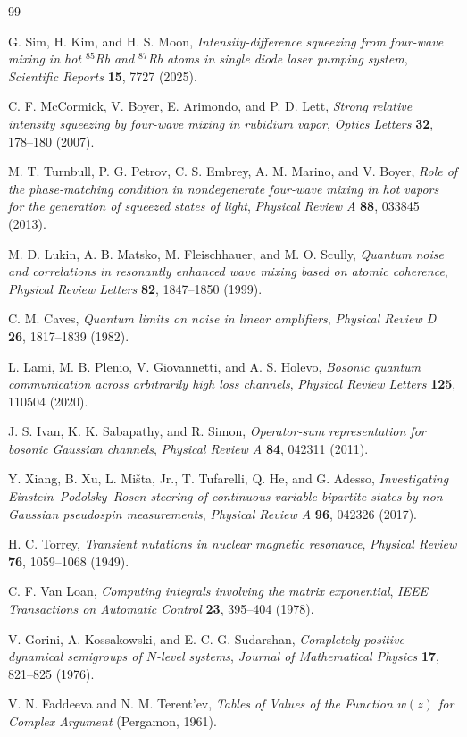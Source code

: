 \documentclass[11pt,a4paper]{article}
\begin{document}
\begin{thebibliography}{99}

G. Sim, H. Kim, and H. S. Moon,
\emph{Intensity-difference squeezing from four-wave mixing in hot
$^{85}$Rb and $^{87}$Rb atoms in single diode laser pumping system},
\emph{Scientific Reports} \textbf{15}, 7727 (2025).

C. F. McCormick, V. Boyer, E. Arimondo, and P. D. Lett,
\emph{Strong relative intensity squeezing by four-wave mixing in rubidium
vapor}, \emph{Optics Letters} \textbf{32}, 178--180 (2007).

M. T. Turnbull, P. G. Petrov, C. S. Embrey, A. M. Marino, and V. Boyer,
\emph{Role of the phase-matching condition in nondegenerate four-wave mixing
in hot vapors for the generation of squeezed states of light},
\emph{Physical Review A} \textbf{88}, 033845 (2013).

M. D. Lukin, A. B. Matsko, M. Fleischhauer, and M. O. Scully,
\emph{Quantum noise and correlations in resonantly enhanced wave mixing
based on atomic coherence}, \emph{Physical Review Letters} \textbf{82},
1847--1850 (1999).

C. M. Caves,
\emph{Quantum limits on noise in linear amplifiers},
\emph{Physical Review D} \textbf{26}, 1817--1839 (1982).

L. Lami, M. B. Plenio, V. Giovannetti, and A. S. Holevo,
\emph{Bosonic quantum communication across arbitrarily high loss channels},
\emph{Physical Review Letters} \textbf{125}, 110504 (2020).

J. S. Ivan, K. K. Sabapathy, and R. Simon,
\emph{Operator-sum representation for bosonic Gaussian channels},
\emph{Physical Review A} \textbf{84}, 042311 (2011).

Y. Xiang, B. Xu, L. Mi\v{s}ta, Jr., T. Tufarelli, Q. He, and G. Adesso,
\emph{Investigating Einstein--Podolsky--Rosen steering of continuous-variable
bipartite states by non-Gaussian pseudospin measurements},
\emph{Physical Review A} \textbf{96}, 042326 (2017).

H. C. Torrey,
\emph{Transient nutations in nuclear magnetic resonance},
\emph{Physical Review} \textbf{76}, 1059--1068 (1949).

C. F. Van Loan,
\emph{Computing integrals involving the matrix exponential},
\emph{IEEE Transactions on Automatic Control} \textbf{23}, 395--404 (1978).

V. Gorini, A. Kossakowski, and E. C. G. Sudarshan,
\emph{Completely positive dynamical semigroups of $N$-level systems},
\emph{Journal of Mathematical Physics} \textbf{17}, 821--825 (1976).

V. N. Faddeeva and N. M. Terent'ev,
\emph{Tables of Values of the Function $w(z)$ for Complex Argument}
(Pergamon, 1961).

\end{thebibliography}
\end{document}
